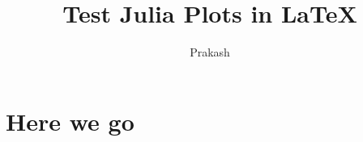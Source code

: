 \documentclass[a4paper]{article}
\author{Prakash}
\title{Test Julia Plots in \LaTeX}
\begin{document}
    \section{Here we go}
        \begin{figure}[h!]
            \centering
            \scalebox{0.2}{}
        \end{figure}
\end{document}
